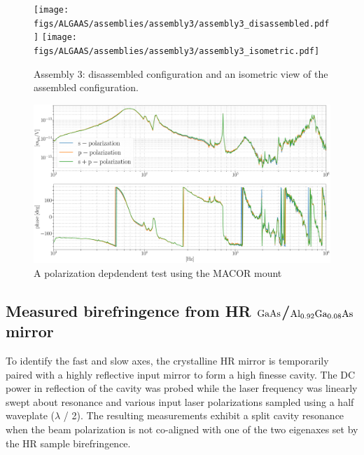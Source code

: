 \begin{figure}[!ht]
    \begin{subcaptiongroup}
	    \texttt{[image: figs/ALGAAS/assemblies/assembly3/assembly3\_disassembled.pdf]}
	    \label{subfig:A3disassembled}
	    \texttt{[image: figs/ALGAAS/assemblies/assembly3/assembly3\_isometric.pdf]}
	    \label{subfig:A3isometric}
    \end{subcaptiongroup}
    \caption{Assembly 3:  disassembled configuration and  an isometric view of the assembled configuration.}
    \label{fig:assembly3}
\end{figure}


\begin{figure}[H]
    \includegraphics[width=\textwidth]{figs/ALGAAS/results_figs/assembly3/petgmsvv64.pdf}
    \caption{A polarization depdendent test using the MACOR mount}
    \label{fig:measurementsum}
\end{figure}



\subsection{Measured birefringence from HR \texorpdfstring{$\mathrm{GaAs}$}{gaas}/\texorpdfstring{$\mathrm{Al_{0.92}Ga_{0.08}As}$}{algaas} mirror}

To identify the fast and slow axes, the crystalline HR mirror is temporarily paired with a highly reflective input mirror to form a high finesse cavity. The DC power in reflection of the cavity was probed while the laser frequency was linearly swept about resonance and various input laser polarizations sampled using a half waveplate ($\lambda$ / 2). The resulting measurements exhibit a split cavity resonance when the beam polarization is not co-aligned with one of the two eigenaxes set by the HR sample birefringence.

